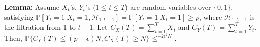 




\newpage

\textbf{Lemma:} Assume $X_t$'s, $Y_t$'s ($1\leq t \leq T$) are random variables over $\{0,1\}$, satisfying $\mathbb{P}[Y_t = 1| X_t = 1, \mathcal{H}_{1:t-1}] = \mathbb{P}[Y_t = 1| X_t = 1] \geq p$, where $\mathcal{H}_{1:t-1}$ is the filtration from 1 to $t-1$. Let $C_X(T) = \sum_{t=1}^T X_t$ and $C_Y(T) = \sum_{t=1}^T Y_t$. Then, $\mathbb{P}\{C_Y(T) \leq (p-\epsilon) N, C_X(T) \geq N \} \leq ^{-2 \epsilon^2 N}$.

